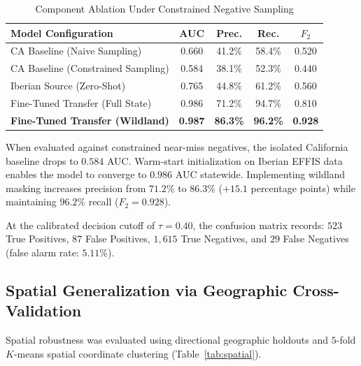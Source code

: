 \documentclass[journal]{IEEEtran}
\begin{document}
\begin{table}[htbp]
\caption{\color{Burgundy}Component Ablation Under Constrained Negative Sampling}
\label{tab:ablation}
\centering
{}
\begin{tabular}{lcccc}
\toprule
\rowcolor{LightGold}
\textbf{\color{Burgundy}Model Configuration} & \textbf{\color{Burgundy}AUC} & \textbf{\color{Burgundy}Prec.} & \textbf{\color{Burgundy}Rec.} & \textbf{\color{Burgundy}$F_2$} \\
\midrule
CA Baseline (Naive Sampling) & 0.660 & 41.2\% & 58.4\% & 0.520 \\
CA Baseline (Constrained Sampling) & 0.584 & 38.1\% & 52.3\% & 0.440 \\
Iberian Source (Zero-Shot) & 0.765 & 44.8\% & 61.2\% & 0.560 \\
Fine-Tuned Transfer (Full State) & 0.986 & 71.2\% & 94.7\% & 0.810 \\
\rowcolor{LightGold}
\textbf{\color{Maroon}Fine-Tuned Transfer (Wildland)} & \textbf{0.987} & \textbf{86.3\%} & \textbf{96.2\%} & \textbf{0.928} \\
\bottomrule
\end{tabular}
\end{table}

When evaluated against constrained near-miss negatives, the isolated California baseline drops to $0.584$ AUC. Warm-start initialization on Iberian EFFIS data enables the model to converge to $0.986$ AUC statewide. Implementing wildland masking increases precision from $71.2\%$ to $86.3\%$ ($+15.1$ percentage points) while maintaining $96.2\%$ recall ($F_2 = 0.928$).

At the calibrated decision cutoff of $\tau = 0.40$, the confusion matrix records: $523$ True Positives, $87$ False Positives, $1,615$ True Negatives, and $29$ False Negatives (false alarm rate: $5.11\%$).

\subsection{Spatial Generalization via Geographic Cross-Validation}
Spatial robustness was evaluated using directional geographic holdouts and $5$-fold $K$-means spatial coordinate clustering (Table~\ref{tab:spatial}).
\end{document}

